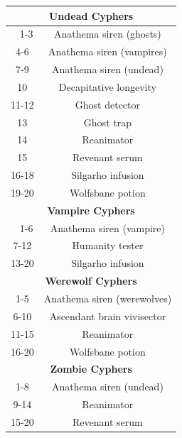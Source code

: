 \begin{longtable}{| c | c |}
\multicolumn{2}{|c|}{\textbf{Undead Cyphers}} \\ \hline 
1-3 & Anathema siren (ghosts) \\ \hline
4-6 & Anathema siren (vampires) \\ \hline
7-9 & Anathema siren (undead) \\ \hline
10 & Decapitative longevity \\ \hline
11-12 & Ghost detector \\ \hline
13 & Ghost trap \\ \hline
14 & Reanimator \\ \hline
15 & Revenant serum \\ \hline
16-18 & Silgarho infusion \\ \hline
19-20 & Wolfsbane potion \\ \hline

\multicolumn{2}{|c|}{\textbf{Vampire Cyphers}} \\ \hline 
1-6 & Anathema siren (vampire) \\ \hline
7-12 & Humanity tester \\ \hline
13-20 & Silgarho infusion \\ \hline

\multicolumn{2}{|c|}{\textbf{Werewolf Cyphers}} \\ \hline
1-5 & Anathema siren (werewolves) \\ \hline
6-10 & Ascendant brain vivisector \\ \hline
11-15 & Reanimator \\ \hline
16-20 & Wolfsbane potion \\ \hline

\multicolumn{2}{|c|}{\textbf{Zombie Cyphers}} \\ \hline
1-8 & Anathema siren (undead) \\ \hline
9-14 & Reanimator \\ \hline
15-20 & Revenant serum \\ \hline

\end{longtable}

